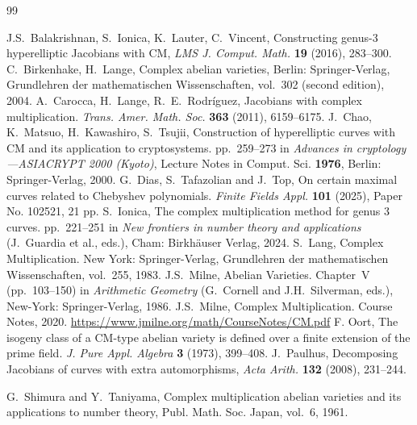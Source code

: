 \documentclass[a4paper,12pt]{amsart}
\numberwithin{equation}{section}
\theoremstyle{plain}
\numberwithin{thm}{section}
\begin{document}
\begin{thebibliography}{99}

 J.S.~Balakrishnan, S.~Ionica, K.~Lauter, 
C.~Vincent, Constructing genus-3 hyperelliptic Jacobians 
with CM, \textit{LMS J. Comput. Math.} \textbf{19} (2016),
283--300.
 C.~Birkenhake, H.~Lange, 
     {Complex abelian varieties},
     Berlin: Springer-Verlag,
    Grundlehren der mathematischen Wissenschaften,
    vol.~302 (second edition), {2004}.
  A.~Carocca, H.~Lange, R.~E.~Rodr\'iguez, Jacobians with complex multiplication. \textit{Trans. Amer. Math. Soc.} \textbf{363} (2011),  6159--6175. 
  J.~Chao, K.~Matsuo, H.~Kawashiro, S.~Tsujii, 
Construction of hyperelliptic curves with CM and its application to cryptosystems. pp.~259--273 in 
\textit{Advances in cryptology—ASIACRYPT 2000 (Kyoto)}, 
Lecture Notes in Comput. Sci. \textbf{1976},
Berlin: Springer-Verlag, 2000.
    G.~Dias, S.~Tafazolian and J.~Top, On certain maximal curves related to Chebyshev polynomials. \textit{Finite Fields Appl.} \textbf{101}  (2025), Paper No. 102521, 21 pp.
    S.~Ionica, The complex multiplication method for genus 3 curves. pp.~221--251 in \textit{New frontiers in number theory and applications} (J.~Guardia et al., eds.),
   Cham: Birkh\"{a}user Verlag, 2024.
    S.~Lang, Complex Multiplication.
   New York: Springer-Verlag,
    Grundlehren der mathematischen Wissenschaften,
    vol.~{255}, {1983}.
     J.S.~Milne, Abelian Varieties.
    Chapter~V (pp.~103--150) in \textit{Arithmetic Geometry}
    (G.~Cornell and J.H.~Silverman, eds.), New-York: Springer-Verlag, 1986.
    J.S.~Milne, Complex Multiplication.
   Course Notes, 2020. \url{https://www.jmilne.org/math/CourseNotes/CM.pdf}
    F. Oort, The isogeny class of a CM-type
   abelian variety is defined over a finite extension of the prime field. \textit{J. Pure Appl. Algebra} \textbf{3}
   (1973), 399--408.
    J.~Paulhus, Decomposing Jacobians of curves with extra automorphisms,
\textit{Acta Arith.} \textbf{132} (2008), 231--244.

  G.~Shimura and Y.~Taniyama, Complex multiplication abelian varieties and its applications to number theory, Publ. Math. Soc. Japan, vol.~6, 1961.


\end{thebibliography}
\end{document}
